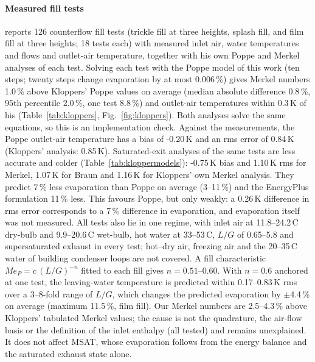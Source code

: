 \documentclass[preprint,12pt]{elsarticle}
\begin{document}
\paragraph{Measured fill tests} \citet{kloppers2003critical} reports 126 counterflow fill tests (trickle fill at three
heights, splash fill, and film fill at three heights; 18 tests each) with measured inlet air, water temperatures and flows
and outlet-air temperature, together with his own Poppe and Merkel analyses of each test. Solving each test with the
Poppe model of this work (ten steps; twenty steps change evaporation by at most 0.006\,\%) gives Merkel numbers 1.0\,\%
above Kloppers' Poppe values on average (median absolute difference 0.8\,\%, 95th percentile 2.0\,\%, one test 8.8\,\%)
and outlet-air temperatures within 0.3\,K of his (Table~\ref{tab:kloppers}, Fig.~\ref{fig:kloppers}). Both analyses
solve the same equations, so this is an implementation check. Against the measurements, the Poppe outlet-air
temperature has a bias of -0.20\,K and an rms error of 0.84\,K (Kloppers' analysis: 0.85\,K). Saturated-exit analyses of
the same tests are less accurate and colder (Table~\ref{tab:kloppermodels}): -0.75\,K bias and 1.10\,K rms for Merkel,
1.07\,K for Braun and 1.16\,K for Kloppers' own Merkel analysis. They predict 7\,\% less evaporation than Poppe on
average (3--11\,\%) and the EnergyPlus formulation 11\,\% less. This favours Poppe, but only weakly: a 0.26\,K difference
in rms error corresponds to a 7\,\% difference in evaporation, and evaporation itself was not measured. All tests also lie
in one regime, with inlet air at 11.8--24.2\,\textdegree C dry-bulb and 9.9--20.6\,\textdegree C wet-bulb, hot water at
33--53\,\textdegree C, $L/G$ of 0.65--5.8 and supersaturated exhaust in every test; hot--dry air, freezing air and the
20--35\,\textdegree C water of building condenser loops are not covered. A fill characteristic $Me_P=c\,(L/G)^{-n}$ fitted
to each fill gives $n=0.51$--0.60. With $n=0.6$ anchored at one test, the leaving-water temperature is predicted within
0.17--0.83\,K rms over a 3--8-fold range of $L/G$, which changes the predicted evaporation by $\pm$4.4\,\% on average
(maximum 11.5\,\%, film fill). Our Merkel numbers are 2.5--4.3\,\% above Kloppers' tabulated Merkel values; the cause is not
the quadrature, the air-flow basis or the definition of the inlet enthalpy (all tested) and remains unexplained. It does
not affect MSAT, whose evaporation follows from the energy balance and the saturated exhaust state alone.

\begin{table}[t]\centering\scriptsize
\caption{Poppe model against the 126 fill tests of \citet{kloppers2003critical}. $Me_P$ vs K.: mean (maximum absolute)
difference from Kloppers' Poppe analysis. $T_{a,o}$: predicted minus measured outlet-air temperature. $n$: fitted fill
exponent. Last three columns: rating-mode prediction of the leaving-water temperature $T_{w,o}$ with a single-point
$n=0.6$ law or a fitted $Me_P=a\,G_w^{b}G_a^{c}$ law, and the change in predicted Poppe evaporation caused by the
$T_{w,o}$ error of the $n=0.6$ law (not an error against measured evaporation, which is not available).}\label{tab:kloppers}

\end{table}
\end{document}
